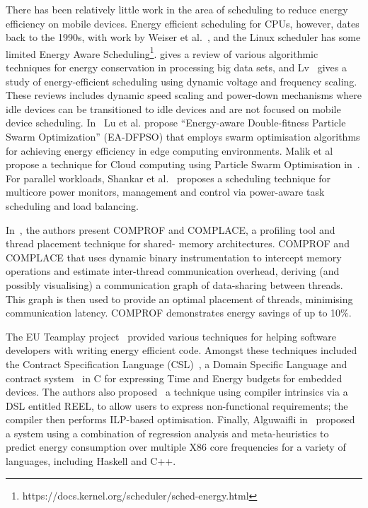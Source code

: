 \documentclass[conference]{IEEEtran}
\begin{document}
There has been relatively little work in the area of scheduling to reduce energy efficiency on mobile devices. Energy efficient scheduling for CPUs, however, dates back to the 1990s, with work by Weiser et al.~\cite{Weiser1996}, and the Linux scheduler has some limited Energy Aware Scheduling\footnote{https://docs.kernel.org/scheduler/sched-energy.html}. \cite{Albers2022} gives a review of various algorithmic techniques for energy conservation in processing big data sets, and Lv~\cite{lv} gives a study of energy-efficient scheduling using dynamic voltage and frequency scaling. These reviews includes dynamic speed scaling and power-down mechanisms where idle devices can be transitioned to idle devices and are not focused on mobile device scheduling. In~\cite{LU2022237} Lu et al. propose ``Energy-aware Double-fitness Particle Swarm Optimization'' (EA-DFPSO) that employs swarm optimisation algorithms for achieving energy efficiency in edge computing environments. Malik et al propose a technique for Cloud computing using Particle Swarm Optimisation in~\cite{malik}. For parallel workloads, Shankar et al.~\cite{shankartowards} proposes a scheduling technique for multicore power monitors, management and control via power-aware task scheduling and load balancing.  

In~\cite{comprof}, the authors present COMPROF and COMPLACE,
a profiling tool and thread placement technique for shared-
memory architectures. COMPROF and COMPLACE that uses dynamic binary instrumentation to intercept memory operations and estimate inter-thread communication overhead, deriving (and possibly visualising) a communication graph of data-sharing between threads. This graph is then used to provide an optimal placement of threads, minimising communication latency. COMPROF demonstrates energy savings of up to 10\%.

The EU Teamplay project~\cite{teamplay} provided various techniques for helping software developers with writing energy efficient code. Amongst these techniques included the Contract Specification Language (CSL)~\cite{CSL}, a Domain Specific Language and contract system~\cite{CSL-Types} in C for expressing Time and Energy budgets for embedded devices. The authors also proposed~\cite{Jadhav:2019:JRWRTC} a technique using compiler intrinsics via a DSL entitled REEL, to allow users to express non-functional requirements; the compiler then performs ILP-based optimisation. Finally, Alguwaifli in~\cite{yasir} proposed a system using a combination of regression analysis and meta-heuristics to predict energy consumption over multiple X86 core frequencies for a variety of languages, including Haskell and C++.
\end{document}
